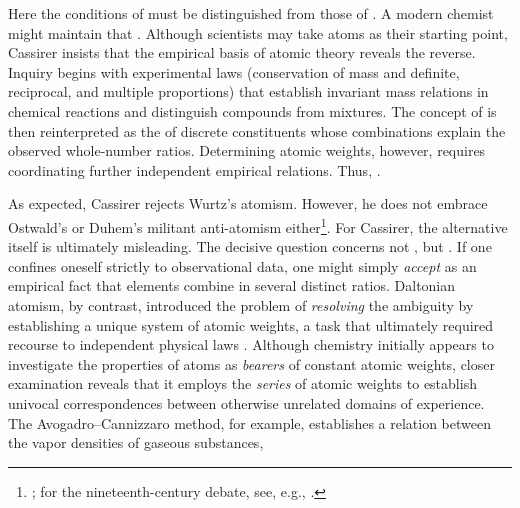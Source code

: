 \documentclass[submitted,12pt]{article}
\begin{document}
Here the conditions of  must be distinguished from those of  . A modern chemist might maintain that  . Although scientists may take atoms as their starting point, Cassirer insists that the empirical basis of atomic theory reveals the reverse. Inquiry begins with experimental laws (conservation of mass and definite, reciprocal, and multiple proportions) that establish invariant mass relations in chemical reactions and distinguish compounds from mixtures. The concept of  is then reinterpreted as the  of discrete constituents whose combinations explain the observed whole-number ratios. Determining atomic weights, however, requires coordinating further independent empirical relations. Thus,  .

As expected, Cassirer rejects Wurtz's  atomism. However, he does not embrace Ostwald's or Duhem's militant anti-atomism either\footnote{\cite{Needham2008}; for the nineteenth-century debate, see, e.g., \citet{Rocke1984}.}. For Cassirer, the alternative itself is ultimately misleading. The decisive question concerns not , but  . If one confines oneself strictly to observational data, one might simply \emph{accept} as an empirical fact that elements combine in several distinct ratios. Daltonian atomism, by contrast, introduced the problem of \emph{resolving} the ambiguity by establishing a unique system of atomic weights, a task that ultimately required recourse to independent physical laws \cite[see][lect.~IV]{Ladenburg1902}. Although chemistry initially appears to investigate the properties of atoms as \emph{bearers} of constant atomic weights, closer examination reveals that it employs the \emph{series} of atomic weights to establish univocal correspondences between otherwise unrelated domains of experience. The Avogadro--Cannizzaro method, for example, establishes a relation between the vapor densities of gaseous substances,
\end{document}
